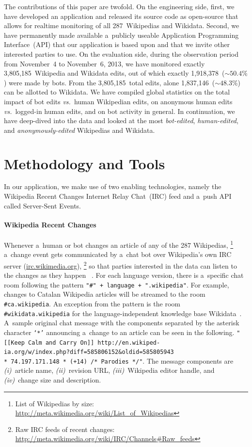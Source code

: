 \documentclass{sig-alternate}
\newcommand{\inlinelistingsize}{\fontsize{8pt}{11pt}}
\let\oldurl\url
\renewcommand{\url}[1]{\inlinelistingsize\oldurl{#1}}
\begin{document}
The contributions of this paper are twofold.
On the engineering side, first, we have developed an application
and released its source code as open-source
that allows for realtime monitoring of all 287~Wikipedias and Wikidata.
Second, we have permanently made available a~publicly useable
Application Programming Interface~(API) that our application
is based upon and that we invite other interested parties to use.
On the evaluation side, during the observation period
from November~4 to November~6, 2013,
we have monitored exactly
3,805,185~Wikipedia and Wikidata edits, 
out of which exactly 1,918,378~($\sim50.4\%$) were made by bots.
From the 3,805,185~total edits,
alone 1,837,146~($\sim48.3\%$) can be allotted to Wikidata.
We have compiled global statistics on the total impact of
bot edits \emph{vs.}\ human Wikipedian edits,
on anonymous human edits \emph{vs.}\ logged-in human edits,
and on bot activity in general.
In continuation, we have deep-dived into the data
and looked at the most \emph{bot-edited}, \emph{human-edited},
and \emph{anonymously-edited} Wikipedias and Wikidata.

\section{Methodology and Tools}

In our application, we make use of two enabling technologies,
namely the Wikipedia Recent Changes Internet Relay Chat~(IRC) feed
and a~push API called Server-Sent Events.

\paragraph{Wikipedia Recent Changes}
\label{sec:wikipedia-recent-changes}

Whenever a~human or bot changes an article
of any of the 287 Wikipedias,%
\footnote{List of Wikipedias by size:
\url{http://meta.wikimedia.org/wiki/List_of_Wikipedias}}
a~change event gets communicated by a~chat bot
over Wikipedia's own IRC server (\url{irc.wikimedia.org}),%
\footnote{Raw IRC feeds of recent changes:
\url{http://meta.wikimedia.org/wiki/IRC/Channels\#Raw_feeds}}
so that parties interested in the data
can listen to the changes as they happen%
~\cite{steiner2013mjnomore}.
For each language version, there is
a~specific chat room following the pattern
\texttt{"\#" + language + ".wikipedia"}.
For example, changes to Catalan Wikipedia articles
will be streamed to the room \texttt{\#ca.wikipedia}.
An exception from the pattern is the room
\texttt{\#wikidata.wikipedia} for the language-independent
knowledge base Wikidata~\cite{vrandecic2012wikidata}.
A~sample original chat message with the components separated
by the asterisk character \texttt{`*'}
announcing a~change to an article
can be seen in the following.
\texttt{"[[Keep Calm and Carry On]] http://en.wikiped-\\ ia.org/w/index.php?diff=585806152\&oldid=585805943 \\* 74.197.171.148 * (+14) /* Parodies */"}.
The message components are \emph{(i)}~article name, \emph{(ii)}~revision URL,
\emph{(iii)}~Wiki\-pedia editor handle, and
\emph{(iv)}~change size and description.
\end{document}
